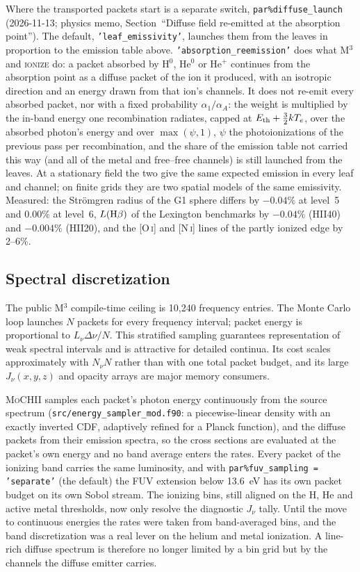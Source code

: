 \documentclass[english,a4paper]{my_memo}
\newcommand{\code}[1]{\texttt{#1}}
\newcommand{\MoCHII}{\textsc{MoCHII}}
\newcommand{\Mthree}{M$^3$}
\newcommand{\Wood}{\textsc{ionize}}
\begin{document}
Where the transported packets start is a separate switch,
\code{par\%diffuse\_launch} (2026-11-13; physics memo, Section~``Diffuse
field re-emitted at the absorption point'').  The default,
\code{'leaf\_emissivity'}, launches them from the leaves in proportion to the
emission table above.  \code{'absorption\_reemission'} does what \Mthree{} and
\Wood{} do: a packet absorbed by H$^0$, He$^0$ or He$^+$ continues from the
absorption point as a diffuse packet of the ion it produced, with an
isotropic direction and an energy drawn from that ion's channels.  It does not
re-emit every absorbed packet, nor with a fixed probability
$\alpha_1/\alpha_A$: the weight is multiplied by the in-band energy one recombination
radiates, capped at $E_{\rm th}+\frac32kT_e$, over the absorbed photon's
energy and over $\max(\psi,1)$, $\psi$ the photoionizations of the previous
pass per recombination, and the share of the emission table not carried this
way (and all of the metal and free--free channels) is still launched from
the leaves.  At a stationary field the two give the same expected emission
in every leaf and channel; on finite grids they are two spatial models of the
same emissivity.  Measured: the Str\"omgren radius of the G1 sphere differs by
$-0.04\%$ at level~5 and $0.00\%$ at level~6, $L({\rm H}\beta)$ of the
Lexington benchmarks by $-0.04\%$ (HII40) and $-0.004\%$ (HII20), and the
[O\,\textsc{i}] and [N\,\textsc{i}] lines of the partly ionized edge by 2--6\%.

\subsection{Spectral discretization}
\label{sec:specdisc}

The public \Mthree{} compile-time ceiling is 10,240 frequency entries.
The Monte Carlo loop launches $N$ packets for every frequency interval;
packet energy is proportional to $L_\nu\Delta\nu/N$.  This stratified
sampling guarantees representation of weak spectral intervals and is
attractive for detailed continua.  Its cost scales approximately with
$N_\nu N$ rather than with one total packet budget, and its large
$J_\nu(x,y,z)$ and opacity arrays are major memory consumers.

\MoCHII{} samples each packet's photon energy continuously from the source
spectrum (\code{src/energy\_sampler\_mod.f90}: a piecewise-linear density
with an exactly inverted CDF, adaptively refined for a Planck function), and
the diffuse packets from their emission spectra, so the cross sections are
evaluated at the packet's own energy and no band average enters the rates.
Every packet of the ionizing band carries the same luminosity, and with
\code{par\%fuv\_sampling = 'separate'} (the default) the FUV extension below
13.6~eV has its own packet budget on its own Sobol stream.  The ionizing bins,
still aligned on the H, He and active metal thresholds, now only resolve the
diagnostic $J_\nu$ tally.  Until the move to continuous energies the rates
were taken from band-averaged bins, and the band discretization was a real
lever on the helium and metal ionization.  A line-rich diffuse spectrum is
therefore no longer limited by a bin grid but by the channels the diffuse
emitter carries.
\end{document}
